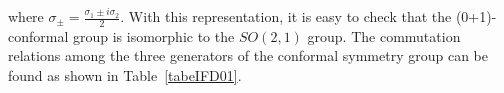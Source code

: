 \documentclass[%
 reprint,
superscriptaddress,
 amsmath,amssymb,
 aps,
]{revtex4-2}
\begin{document}
where $\sigma_{\pm}=\frac{\sigma_{1}\pm i\sigma_{2}}{2}$. With this representation, it is easy to check that the (0+1)-conformal group is isomorphic to the $SO(2,1)$ group. The commutation relations among the three generators of the conformal symmetry group can be found as shown in Table~\ref{tabeIFD01}.  
%
\begin{table}[h!]
\centering
\caption{\label{tabeIFD01}$0+1$ conformal algebra in IFD}
\end{table}
\end{document}
